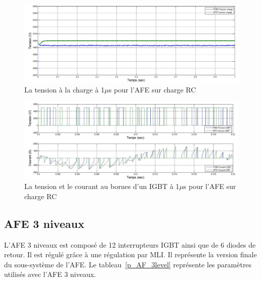 \documentclass[11pt,letterpaper,final]{report}
\begin{document}
\begin{figure}[htb]
\centering
\includegraphics[scale=0.5]{Fig/AFERC/vch.jpg}
\caption{La tension à la charge à 1$\mu$s pour l'AFE sur charge RC}
\label{AF_RC_ten}
\end{figure}



\begin{figure}[htb]
\centering
\includegraphics[scale=0.5]{Fig/AFERC/IGBT.jpg}
\caption{La tension et le courant au bornes d'un IGBT à 1$\mu$s pour l'AFE sur charge RC}
\label{AF_RC_igbt}
\end{figure}

\clearpage
\subsection{AFE 3 niveaux}
L'AFE 3 niveaux est composé de 12 interrupteurs IGBT ainsi que de 6 diodes de retour. Il est régulé grâce à une régulation par MLI. Il représente la version finale du sous-système de l'AFE. Le tableau~\ref{p_AF_3level} représente les paramètres utilisés avec l'AFE 3 niveaux.
\end{document}
